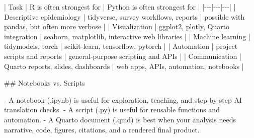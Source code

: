 \documentclass[
  letterpaper,
  DIV=11,
  numbers=noendperiod,
  oneside]{scrreprt}
\newenvironment{Shaded}{\begin{snugshade}}{\end{snugshade}}
\newcommand{\FunctionTok}[1]{\textcolor[rgb]{0.28,0.35,0.67}{#1}}
\newcommand{\InformationTok}[1]{\textcolor[rgb]{0.37,0.37,0.37}{#1}}
\newcommand{\NormalTok}[1]{\textcolor[rgb]{0.00,0.23,0.31}{#1}}
\newcommand{\PreprocessorTok}[1]{\textcolor[rgb]{0.68,0.00,0.00}{#1}}
\newcommand{\SpecialStringTok}[1]{\textcolor[rgb]{0.13,0.47,0.30}{#1}}
\begin{document}
\begin{Shaded}
\begin{Highlighting}[numbers=left,,]
\PreprocessorTok{|}\NormalTok{ Task }\PreprocessorTok{|}\NormalTok{ R is often strongest for }\PreprocessorTok{|}\NormalTok{ Python is often strongest for }\PreprocessorTok{|}
\PreprocessorTok{|{-}{-}{-}|{-}{-}{-}|{-}{-}{-}|}
\PreprocessorTok{|}\NormalTok{ Descriptive epidemiology }\PreprocessorTok{|} \InformationTok{\textasciigrave{}tidyverse\textasciigrave{}}\NormalTok{, survey workflows, reports }\PreprocessorTok{|}\NormalTok{ possible with }\InformationTok{\textasciigrave{}pandas\textasciigrave{}}\NormalTok{, but often more verbose }\PreprocessorTok{|}
\PreprocessorTok{|}\NormalTok{ Visualization }\PreprocessorTok{|} \InformationTok{\textasciigrave{}ggplot2\textasciigrave{}}\NormalTok{, }\InformationTok{\textasciigrave{}plotly\textasciigrave{}}\NormalTok{, Quarto integration }\PreprocessorTok{|} \InformationTok{\textasciigrave{}seaborn\textasciigrave{}}\NormalTok{, }\InformationTok{\textasciigrave{}matplotlib\textasciigrave{}}\NormalTok{, interactive web libraries }\PreprocessorTok{|}
\PreprocessorTok{|}\NormalTok{ Machine learning }\PreprocessorTok{|} \InformationTok{\textasciigrave{}tidymodels\textasciigrave{}}\NormalTok{, }\InformationTok{\textasciigrave{}torch\textasciigrave{}} \PreprocessorTok{|} \InformationTok{\textasciigrave{}scikit{-}learn\textasciigrave{}}\NormalTok{, }\InformationTok{\textasciigrave{}tensorflow\textasciigrave{}}\NormalTok{, }\InformationTok{\textasciigrave{}pytorch\textasciigrave{}} \PreprocessorTok{|}
\PreprocessorTok{|}\NormalTok{ Automation }\PreprocessorTok{|}\NormalTok{ project scripts and reports }\PreprocessorTok{|}\NormalTok{ general{-}purpose scripting and APIs }\PreprocessorTok{|}
\PreprocessorTok{|}\NormalTok{ Communication }\PreprocessorTok{|}\NormalTok{ Quarto reports, slides, dashboards }\PreprocessorTok{|}\NormalTok{ web apps, APIs, automation, notebooks }\PreprocessorTok{|}

\FunctionTok{\#\# Notebooks vs. Scripts}

\SpecialStringTok{{-} }\NormalTok{A notebook (}\InformationTok{\textasciigrave{}.ipynb\textasciigrave{}}\NormalTok{) is useful for exploration, teaching, and step{-}by{-}step AI translation checks.}
\SpecialStringTok{{-} }\NormalTok{A script (}\InformationTok{\textasciigrave{}.py\textasciigrave{}}\NormalTok{) is useful for reusable functions and automation.}
\SpecialStringTok{{-} }\NormalTok{A Quarto document (}\InformationTok{\textasciigrave{}.qmd\textasciigrave{}}\NormalTok{) is best when your analysis needs narrative, code, figures, citations, and a rendered final product.}


\end{Highlighting}
\end{Shaded}
\end{document}
